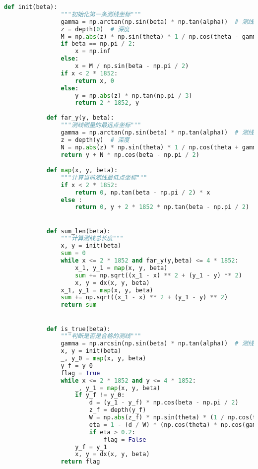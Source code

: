 \documentclass[withoutpreface,bwprint]{cumcmthesis} %
\begin{document}
\begin{appendices}
\begin{lstlisting}[language=python]
            def init(beta):
                """初始化第一条测线坐标"""
                gamma = np.arctan(np.sin(beta) * np.tan(alpha))  # 测线斜波交线和投影夹角
                z = depth(0)  # 深度
                M = np.abs(z) * np.sin(theta) * 1 / np.cos(theta - gamma) * np.cos(gamma) # 平分线一侧覆盖宽度
                if beta == np.pi / 2:
                    x = np.inf
                else:
                    x = M / np.sin(beta - np.pi / 2)
                if x < 2 * 1852:
                    return x, 0
                else:
                    y = np.abs(z) * np.tan(np.pi / 3)
                    return 2 * 1852, y
                
            def far_y(y, beta):
                """测线侧量的最远点坐标"""
                gamma = np.arctan(np.sin(beta) * np.tan(alpha))  # 测线斜波交线和投影夹角
                z = depth(y)  # 深度
                N = np.abs(z) * np.sin(theta) * 1 / np.cos(theta + gamma) * np.cos(gamma) # 平分线一侧覆盖宽度
                return y + N * np.cos(beta - np.pi / 2)

            def map(x, y, beta):
                """计算当前测线最低点坐标"""
                if x < 2 * 1852:
                    return 0, np.tan(beta - np.pi / 2) * x
                else :
                    return 0, y + 2 * 1852 * np.tan(beta - np.pi / 2)


            def sum_len(beta):
                """计算测线总长度"""
                x, y = init(beta)
                sum = 0
                while x <= 2 * 1852 and far_y(y,beta) <= 4 * 1852:
                    x_1, y_1 = map(x, y, beta)
                    sum += np.sqrt((x_1 - x) ** 2 + (y_1 - y) ** 2)
                    x, y = dx(x, y, beta)
                x_1, y_1 = map(x, y, beta)
                sum += np.sqrt((x_1 - x) ** 2 + (y_1 - y) ** 2)
                return sum


            def is_true(beta):
                """判断是否是合格的测线"""
                gamma = np.arcsin(np.sin(beta) * np.tan(alpha))  # 测线斜波交线和投影夹角
                x, y = init(beta)
                _, y_0 = map(x, y, beta)
                y_f = y_0
                flag = True
                while x <= 2 * 1852 and y <= 4 * 1852:
                    _, y_1 = map(x, y, beta)
                    if y_f != y_0:
                        d = (y_1 - y_f) * np.cos(beta - np.pi / 2)
                        z_f = depth(y_f)
                        W = np.abs(z_f) * np.sin(theta) * (1 / np.cos(theta - gamma) + 1 / np.cos(theta + gamma)) * np.cos(gamma) # 覆盖宽度
                        eta = 1 - (d / W) * (np.cos(theta) * np.cos(gamma) / np.cos(theta - gamma))  # 覆盖率
                        if eta > 0.2:
                            flag = False
                    y_f = y_1
                    x, y = dx(x, y, beta)
                return flag



\end{lstlisting}
\end{appendices}
\end{document}
